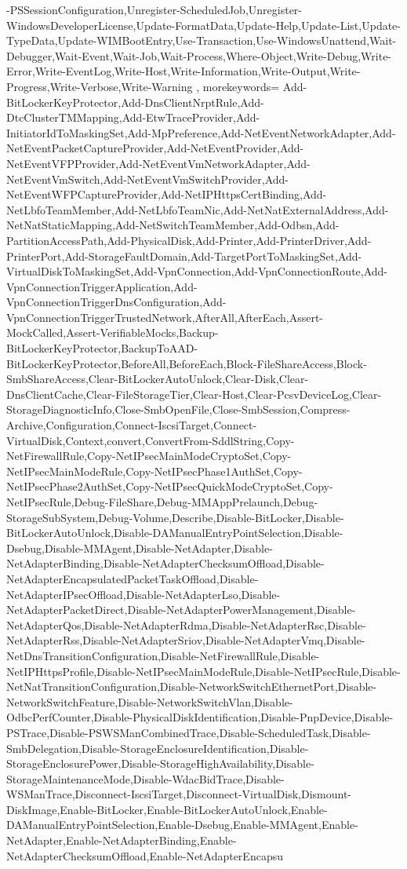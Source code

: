 {{-PSSessionConfiguration,Unregister-ScheduledJob,Unregister-WindowsDeveloperLicense,Update-FormatData,Update-Help,Update-List,Update-TypeData,Update-WIMBootEntry,Use-Transaction,Use-WindowsUnattend,Wait-Debugger,Wait-Event,Wait-Job,Wait-Process,Where-Object,Write-Debug,Write-Error,Write-EventLog,Write-Host,Write-Information,Write-Output,Write-Progress,Write-Verbose,Write-Warning
	},
	morekeywords={
		Add-BitLockerKeyProtector,Add-DnsClientNrptRule,Add-DtcClusterTMMapping,Add-EtwTraceProvider,Add-InitiatorIdToMaskingSet,Add-MpPreference,Add-NetEventNetworkAdapter,Add-NetEventPacketCaptureProvider,Add-NetEventProvider,Add-NetEventVFPProvider,Add-NetEventVmNetworkAdapter,Add-NetEventVmSwitch,Add-NetEventVmSwitchProvider,Add-NetEventWFPCaptureProvider,Add-NetIPHttpsCertBinding,Add-NetLbfoTeamMember,Add-NetLbfoTeamNic,Add-NetNatExternalAddress,Add-NetNatStaticMapping,Add-NetSwitchTeamMember,Add-Odbsn,Add-PartitionAccessPath,Add-PhysicalDisk,Add-Printer,Add-PrinterDriver,Add-PrinterPort,Add-StorageFaultDomain,Add-TargetPortToMaskingSet,Add-VirtualDiskToMaskingSet,Add-VpnConnection,Add-VpnConnectionRoute,Add-VpnConnectionTriggerApplication,Add-VpnConnectionTriggerDnsConfiguration,Add-VpnConnectionTriggerTrustedNetwork,AfterAll,AfterEach,Assert-MockCalled,Assert-VerifiableMocks,Backup-BitLockerKeyProtector,BackupToAAD-BitLockerKeyProtector,BeforeAll,BeforeEach,Block-FileShareAccess,Block-SmbShareAccess,Clear-BitLockerAutoUnlock,Clear-Disk,Clear-DnsClientCache,Clear-FileStorageTier,Clear-Host,Clear-PcsvDeviceLog,Clear-StorageDiagnosticInfo,Close-SmbOpenFile,Close-SmbSession,Compress-Archive,Configuration,Connect-IscsiTarget,Connect-VirtualDisk,Context,convert,ConvertFrom-SddlString,Copy-NetFirewallRule,Copy-NetIPsecMainModeCryptoSet,Copy-NetIPsecMainModeRule,Copy-NetIPsecPhase1AuthSet,Copy-NetIPsecPhase2AuthSet,Copy-NetIPsecQuickModeCryptoSet,Copy-NetIPsecRule,Debug-FileShare,Debug-MMAppPrelaunch,Debug-StorageSubSystem,Debug-Volume,Describe,Disable-BitLocker,Disable-BitLockerAutoUnlock,Disable-DAManualEntryPointSelection,Disable-Dsebug,Disable-MMAgent,Disable-NetAdapter,Disable-NetAdapterBinding,Disable-NetAdapterChecksumOffload,Disable-NetAdapterEncapsulatedPacketTaskOffload,Disable-NetAdapterIPsecOffload,Disable-NetAdapterLso,Disable-NetAdapterPacketDirect,Disable-NetAdapterPowerManagement,Disable-NetAdapterQos,Disable-NetAdapterRdma,Disable-NetAdapterRsc,Disable-NetAdapterRss,Disable-NetAdapterSriov,Disable-NetAdapterVmq,Disable-NetDnsTransitionConfiguration,Disable-NetFirewallRule,Disable-NetIPHttpsProfile,Disable-NetIPsecMainModeRule,Disable-NetIPsecRule,Disable-NetNatTransitionConfiguration,Disable-NetworkSwitchEthernetPort,Disable-NetworkSwitchFeature,Disable-NetworkSwitchVlan,Disable-OdbcPerfCounter,Disable-PhysicalDiskIdentification,Disable-PnpDevice,Disable-PSTrace,Disable-PSWSManCombinedTrace,Disable-ScheduledTask,Disable-SmbDelegation,Disable-StorageEnclosureIdentification,Disable-StorageEnclosurePower,Disable-StorageHighAvailability,Disable-StorageMaintenanceMode,Disable-WdacBidTrace,Disable-WSManTrace,Disconnect-IscsiTarget,Disconnect-VirtualDisk,Dismount-DiskImage,Enable-BitLocker,Enable-BitLockerAutoUnlock,Enable-DAManualEntryPointSelection,Enable-Dsebug,Enable-MMAgent,Enable-NetAdapter,Enable-NetAdapterBinding,Enable-NetAdapterChecksumOffload,Enable-NetAdapterEncapsu}}
